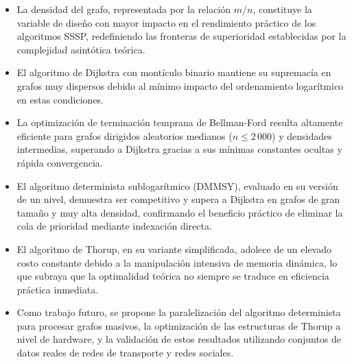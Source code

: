 \documentclass[conference]{IEEEtran}
\begin{document}
\begin{itemize}
    \item La densidad del grafo, representada por la relación $m/n$, constituye la variable de diseño con mayor impacto en el rendimiento práctico de los algoritmos SSSP, redefiniendo las fronteras de superioridad establecidas por la complejidad asintótica teórica.
    \item El algoritmo de Dijkstra con montículo binario mantiene su supremacía en grafos muy dispersos debido al mínimo impacto del ordenamiento logarítmico en estas condiciones.
    \item La optimización de terminación temprana de Bellman-Ford resulta altamente eficiente para grafos dirigidos aleatorios medianos ($n \leq 2\,000$) y densidades intermedias, superando a Dijkstra gracias a sus mínimas constantes ocultas y rápida convergencia.
    \item El algoritmo determinista sublogarítmico (DMMSY), evaluado en su versión de un nivel, demuestra ser competitivo y supera a Dijkstra en grafos de gran tamaño y muy alta densidad, confirmando el beneficio práctico de eliminar la cola de prioridad mediante indexación directa.
    \item El algoritmo de Thorup, en su variante simplificada, adolece de un elevado costo constante debido a la manipulación intensiva de memoria dinámica, lo que subraya que la optimalidad teórica no siempre se traduce en eficiencia práctica inmediata.
    \item Como trabajo futuro, se propone la paralelización del algoritmo determinista para procesar grafos masivos, la optimización de las estructuras de Thorup a nivel de hardware, y la validación de estos resultados utilizando conjuntos de datos reales de redes de transporte y redes sociales.
\end{itemize}
\end{document}
